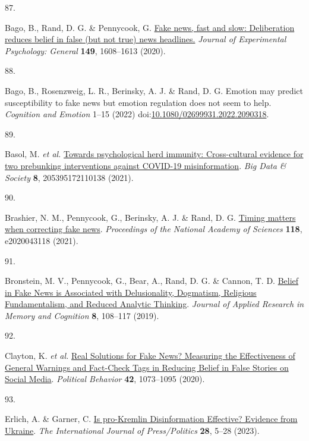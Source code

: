 \documentclass[
  man]{apa6}
\newlength{\cslhangindent}
\newlength{\csllabelwidth}
\newenvironment{CSLReferences}[2] %
 {\begin{list}{}{%
  \setlength{\itemindent}{0pt}
  \setlength{\leftmargin}{0pt}
  \setlength{\parsep}{0pt}
  \ifodd #1
   \setlength{\leftmargin}{\cslhangindent}
   \setlength{\itemindent}{-1\cslhangindent}
  \fi
  \setlength{\itemsep}{#2\baselineskip}}}
 {\end{list}}
\newcommand{\CSLLeftMargin}[1]{\parbox[t]{\csllabelwidth}{\strut#1\strut}}
\newcommand{\CSLRightInline}[1]{\parbox[t]{\linewidth - \csllabelwidth}{\strut#1\strut}}
\begin{document}
\begin{CSLReferences}{0}{0}
\CSLLeftMargin{87. }%
\CSLRightInline{*Bago, B., Rand, D. G. \& Pennycook, G. \href{https://doi.org/10.1037/xge0000729}{Fake news, fast and slow: Deliberation reduces belief in false (but not true) news headlines.} \emph{Journal of Experimental Psychology: General} \textbf{149}, 1608--1613 (2020).}

\CSLLeftMargin{88. }%
\CSLRightInline{*Bago, B., Rosenzweig, L. R., Berinsky, A. J. \& Rand, D. G. Emotion may predict susceptibility to fake news but emotion regulation does not seem to help. \emph{Cognition and Emotion} 1--15 (2022) doi:\href{https://doi.org/10.1080/02699931.2022.2090318}{10.1080/02699931.2022.2090318}.}

\CSLLeftMargin{89. }%
\CSLRightInline{*Basol, M. \emph{et al.} \href{https://doi.org/10.1177/20539517211013868}{Towards psychological herd immunity: Cross-cultural evidence for two prebunking interventions against COVID-19 misinformation}. \emph{Big Data \& Society} \textbf{8}, 205395172110138 (2021).}

\CSLLeftMargin{90. }%
\CSLRightInline{*Brashier, N. M., Pennycook, G., Berinsky, A. J. \& Rand, D. G. \href{https://doi.org/10.1073/pnas.2020043118}{Timing matters when correcting fake news}. \emph{Proceedings of the National Academy of Sciences} \textbf{118}, e2020043118 (2021).}

\CSLLeftMargin{91. }%
\CSLRightInline{*Bronstein, M. V., Pennycook, G., Bear, A., Rand, D. G. \& Cannon, T. D. \href{https://doi.org/10.1016/j.jarmac.2018.09.005}{Belief in Fake News is Associated with Delusionality, Dogmatism, Religious Fundamentalism, and Reduced Analytic Thinking}. \emph{Journal of Applied Research in Memory and Cognition} \textbf{8}, 108--117 (2019).}

\CSLLeftMargin{92. }%
\CSLRightInline{*Clayton, K. \emph{et al.} \href{https://doi.org/10.1007/s11109-019-09533-0}{Real Solutions for Fake News? Measuring the Effectiveness of General Warnings and Fact-Check Tags in Reducing Belief in False Stories on Social Media}. \emph{Political Behavior} \textbf{42}, 1073--1095 (2020).}

\CSLLeftMargin{93. }%
\CSLRightInline{*Erlich, A. \& Garner, C. \href{https://doi.org/10.1177/19401612211045221}{Is pro-Kremlin Disinformation Effective? Evidence from Ukraine}. \emph{The International Journal of Press/Politics} \textbf{28}, 5--28 (2023).}


\end{CSLReferences}
\end{document}
